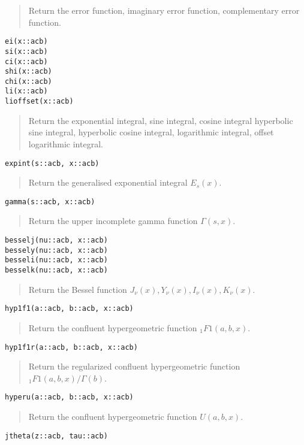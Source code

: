 \documentclass[a4paper,10pt]{article}
\newcommand{\desc}[1]{\vspace{-3mm}\begin{quote}#1\end{quote}}
\begin{document}
{{\desc{Return the error function, imaginary error function, complementary error function.}

\begin{lstlisting}
ei(x::acb)
si(x::acb)
ci(x::acb)
shi(x::acb)
chi(x::acb)
li(x::acb)
lioffset(x::acb)
\end{lstlisting}

\desc{Return the exponential integral, sine integral, cosine integral
hyperbolic sine integral, hyperbolic cosine integral, logarithmic integral,
offset logarithmic integral.}

\begin{lstlisting}
expint(s::acb, x::acb)
\end{lstlisting}

\desc{Return the generalised exponential integral $E_s(x)$.}

\begin{lstlisting}
gamma(s::acb, x::acb)
\end{lstlisting}

\desc{Return the upper incomplete gamma function $\Gamma(s,x)$.}

\begin{lstlisting}
besselj(nu::acb, x::acb)
bessely(nu::acb, x::acb)
besseli(nu::acb, x::acb)
besselk(nu::acb, x::acb)
\end{lstlisting}

\desc{Return the Bessel function $J_{\nu}(x), Y_{\nu}(x), I_{\nu}(x), K_{\nu}(x)$.}

\begin{lstlisting}
hyp1f1(a::acb, b::acb, x::acb)
\end{lstlisting}

\desc{Return the confluent hypergeometric function ${}_1F1(a,b,x)$.}

\begin{lstlisting}
hyp1f1r(a::acb, b::acb, x::acb)
\end{lstlisting}

\desc{Return the regularized confluent hypergeometric function ${}_1F1(a,b,x) / \Gamma(b)$.}

\begin{lstlisting}
hyperu(a::acb, b::acb, x::acb)
\end{lstlisting}

\desc{Return the confluent hypergeometric function $U(a,b,x)$.}

\begin{lstlisting}
jtheta(z::acb, tau::acb)
\end{lstlisting}

}}
\end{document}
